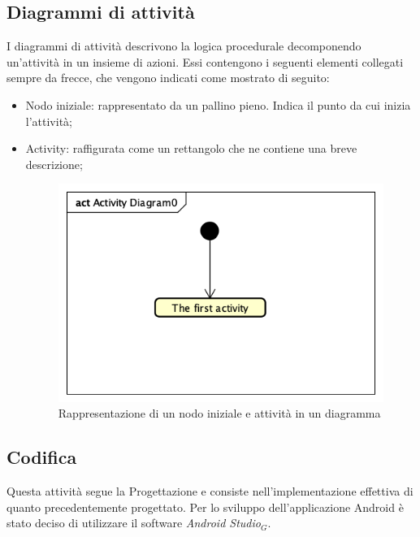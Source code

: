 \subsection{Diagrammi di attività}
\label{DiagrammiAttivita}
I diagrammi di attività descrivono la logica procedurale decomponendo un'attività in un insieme di azioni. Essi contengono i seguenti elementi collegati sempre da frecce, che vengono indicati come mostrato di seguito:
\begin{itemize}
	\item Nodo iniziale: rappresentato da un pallino pieno. Indica il punto da cui inizia l'attività;
	\item Activity: raffigurata come un rettangolo che ne contiene una breve descrizione;
	\begin{figure}[h]
		\centering
		\includegraphics[scale=0.5]{images/PrimaActivity.png}
		\caption{Rappresentazione di un nodo iniziale e attività in un diagramma}\label{}
	\end{figure}
	
\end{itemize}

\subsection{Codifica}
Questa attività segue la Progettazione e consiste nell'implementazione effettiva di quanto precedentemente progettato. Per lo sviluppo dell'applicazione Android è stato deciso di utilizzare il software \textit{Android Studio$_{G}$}.
